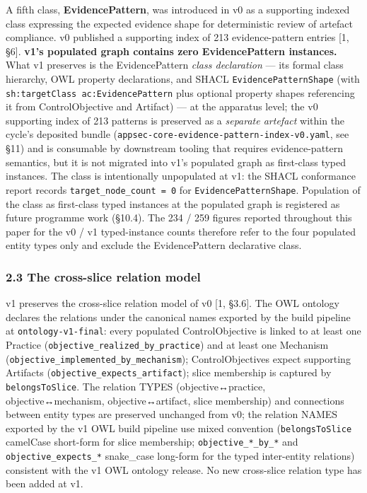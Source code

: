 \documentclass[
]{article}
\begin{document}
A fifth class, \textbf{EvidencePattern}, was introduced in v0 as a
supporting indexed class expressing the expected evidence shape for
deterministic review of artefact compliance. v0 published a supporting
index of 213 evidence-pattern entries {[}1, §6{]}. \textbf{v1's
populated graph contains zero EvidencePattern instances.} What v1
preserves is the EvidencePattern \emph{class declaration} --- its formal
class hierarchy, OWL property declarations, and SHACL
\texttt{EvidencePatternShape} (with
\texttt{sh:targetClass\ ac:EvidencePattern} plus optional property
shapes referencing it from ControlObjective and Artifact) --- at the
apparatus level; the v0 supporting index of 213 patterns is preserved as
a \emph{separate artefact} within the cycle's deposited bundle
(\texttt{appsec-core-evidence-pattern-index-v0.yaml}, see §11) and is
consumable by downstream tooling that requires evidence-pattern
semantics, but it is not migrated into v1's populated graph as
first-class typed instances. The class is intentionally unpopulated at
v1: the SHACL conformance report records
\texttt{target\_node\_count\ =\ 0} for \texttt{EvidencePatternShape}.
Population of the class as first-class typed instances at the populated
graph is registered as future programme work (§10.4). The 234 / 259
figures reported throughout this paper for the v0 / v1 typed-instance
counts therefore refer to the four populated entity types only and
exclude the EvidencePattern declarative class.

\subsubsection{2.3 The cross-slice relation
model}\label{the-cross-slice-relation-model}

v1 preserves the cross-slice relation model of v0 {[}1, §3.6{]}. The OWL
ontology declares the relations under the canonical names exported by
the build pipeline at \texttt{ontology-v1-final}: every populated
ControlObjective is linked to at least one Practice
(\texttt{objective\_realized\_by\_practice}) and at least one Mechanism
(\texttt{objective\_implemented\_by\_mechanism}); ControlObjectives
expect supporting Artifacts (\texttt{objective\_expects\_artifact});
slice membership is captured by \texttt{belongsToSlice}. The relation
TYPES (objective↔practice, objective↔mechanism, objective↔artifact,
slice membership) and connections between entity types are preserved
unchanged from v0; the relation NAMES exported by the v1 OWL build
pipeline use mixed convention (\texttt{belongsToSlice} camelCase
short-form for slice membership; \texttt{objective\_*\_by\_*} and
\texttt{objective\_expects\_*} snake\_case long-form for the typed
inter-entity relations) consistent with the v1 OWL ontology release. No
new cross-slice relation type has been added at v1.
\end{document}

